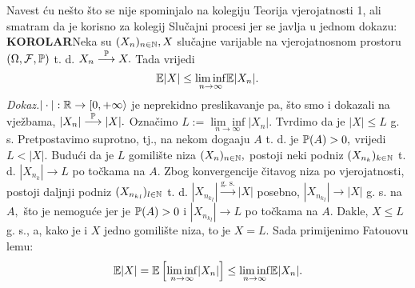 \documentclass{article}
\begin{document}
Navest ću nešto što se nije spominjalo na kolegiju Teorija vjerojatnosti 1, ali smatram da je korisno za kolegij Slučajni procesi jer se javlja u jednom dokazu:\newline\newline 
\textbf{KOROLAR}\newline Neka su \((X_n)_{n\in\Bbb N},X\) slučajne varijable na vjerojatnosnom prostoru \((\Omega,\mathcal F,\Bbb P)\) t. d. \(X_n\overset{\Bbb P}{\longrightarrow}X.\) Tada vrijedi \[\Bbb E|X|\le\underset{n\to\infty}{\lim\inf}\Bbb E|X_n|.\]
\textit{Dokaz.}\newline \(|\cdot|:\Bbb R\to[0,+\infty\rangle\) je neprekidno preslikavanje pa, što smo i dokazali na vježbama, \(|X_n|\overset{\Bbb P}{\longrightarrow}|X|.\) Označimo \(L:=\underset{n\to\infty}{\lim\inf}|X_n|.\) Tvrdimo da je \(|X|\le L\) g. s. Pretpostavimo suprotno, tj., na nekom doga\dj{}aju \(A\) t. d. je \(\Bbb P(A)>0,\) vrijedi \(L<|X|.\) Budući da je \(L\) gomilište niza \((X_n)_{n\in\Bbb N},\) postoji neki podniz \((X_{n_k})_{k\in\Bbb N}\) t. d. \(|X_{n_k}|\to L\) po točkama na \(A.\) Zbog konvergencije čitavog niza po vjerojatnosti, postoji daljnji podniz \((X_{{n_k}_l})_{l\in\Bbb N}\) t. d. \(|X_{{n_k}_l}|\overset{\text{g. s.}}{\longrightarrow}|X|\) posebno, \(|X_{{n_k}_l}|\to|X|\) g. s. na \(A,\) što je nemoguće jer je \(\Bbb P(A)>0\) i \(|X_{{n_k}_l}|\to L\) po točkama na \(A.\) Dakle, \(X\le L\)  g. s., a, kako je i \(X\) jedno gomilište niza, to je \(X=L.\) Sada primijenimo Fatouovu lemu: \[\Bbb E|X|=\Bbb E\left[\underset{n\to\infty}{\lim\inf}|X_n|\right]\le\underset{n\to\infty}{\lim\inf}\Bbb E|X_n|.\] 
\newpage
\end{document}
